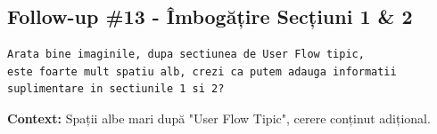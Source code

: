 \documentclass[11pt,a4paper]{article}
\begin{document}
\subsection{Follow-up \#13 - Îmbogățire Secțiuni 1 \& 2}

\begin{tcolorbox}[colback=promptbackground,colframe=blue!75!black,title=Prompt Input]
\begin{verbatim}
Arata bine imaginile, dupa sectiunea de User Flow tipic,
este foarte mult spatiu alb, crezi ca putem adauga informatii
suplimentare in sectiunile 1 si 2?
\end{verbatim}
\end{tcolorbox}

\textbf{Context:} Spații albe mari după "User Flow Tipic", cerere conținut adițional.
\end{document}

